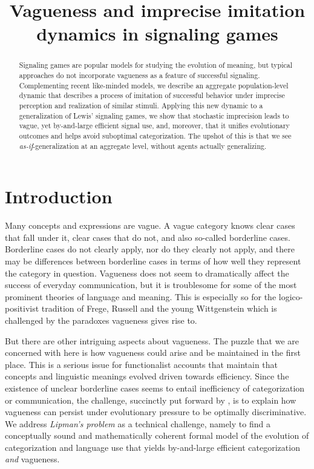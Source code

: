 \documentclass[fleqn,reqno,10pt]{article}
\title{Vagueness and imprecise imitation dynamics in signaling games}
\date{}
\begin{document}
\maketitle

\begin{abstract}
  Signaling games are popular models for studying the evolution of meaning, but typical
  approaches do not incorporate vagueness as a feature of successful signaling.  Complementing
  recent like-minded models, we describe an aggregate population-level dynamic that describes a
  process of imitation of successful behavior under imprecise perception and realization of
  similar stimuli. Applying this new dynamic to a generalization of Lewis' signaling games, we
  show that stochastic imprecision leads to vague, yet by-and-large efficient signal use, and,
  moreover, that it unifies evolutionary outcomes and helps avoid suboptimal
  categorization. The upshot of this is that we see \emph{as-if}-generalization at an aggregate
  level, without agents actually generalizing.
\end{abstract}

\section{Introduction}
\label{sec:introduction}

Many concepts and expressions are vague. A vague category knows clear
cases that fall under it, clear cases that do not, and also so-called
borderline cases. Borderline cases do not clearly apply, nor do they
clearly not apply, and there may be differences between borderline
cases in terms of how well they represent the category in
question. Vagueness does not seem to dramatically affect the success
of everyday communication, but it is troublesome for some of the most
prominent theories of language and meaning. This is especially so for the logico-positivist tradition of Frege, Russell and the young
Wittgenstein which is challenged by the paradoxes vagueness gives rise
to. 

But there are other intriguing aspects about vagueness. The puzzle
that we are concerned with here is how vagueness could arise and be
maintained in the first place. This is a serious issue for
functionalist accounts that maintain that concepts and linguistic
meanings evolved driven towards efficiency. Since the existence of
unclear borderline cases seems to entail inefficiency of
categorization or communication, the challenge, succinctly put forward
by \citet{Lipman2009:Why-is-Language}, is to explain how vagueness can
persist under evolutionary pressure to be optimally discriminative. We
address \emph{Lipman's problem} as a technical challenge, namely to
find a conceptually sound and mathematically coherent formal model of
the evolution of categorization and language use that yields
by-and-large efficient categorization \emph{and} vagueness.
\end{document}
